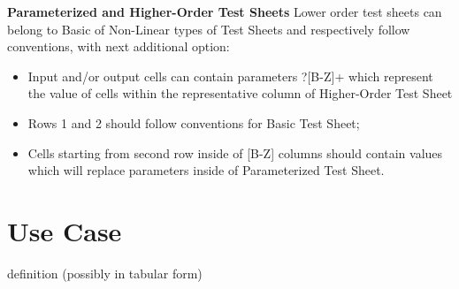 
\textbf{ Parameterized and Higher-Order Test Sheets}
Lower order test sheets can belong to Basic of Non-Linear types of Test Sheets and respectively follow conventions, with next additional option:
\begin{itemize}
\item Input and/or output cells can contain parameters ?[B-Z]+ which represent the value of cells within the representative column of Higher-Order Test Sheet
\item Rows 1 and 2 should follow conventions for Basic Test Sheet;
\item Cells starting from second row inside of [B-Z] columns should contain values which will replace parameters inside of Parameterized Test Sheet.
\end{itemize}

 \section{Use Case}
 definition (possibly in tabular form)


